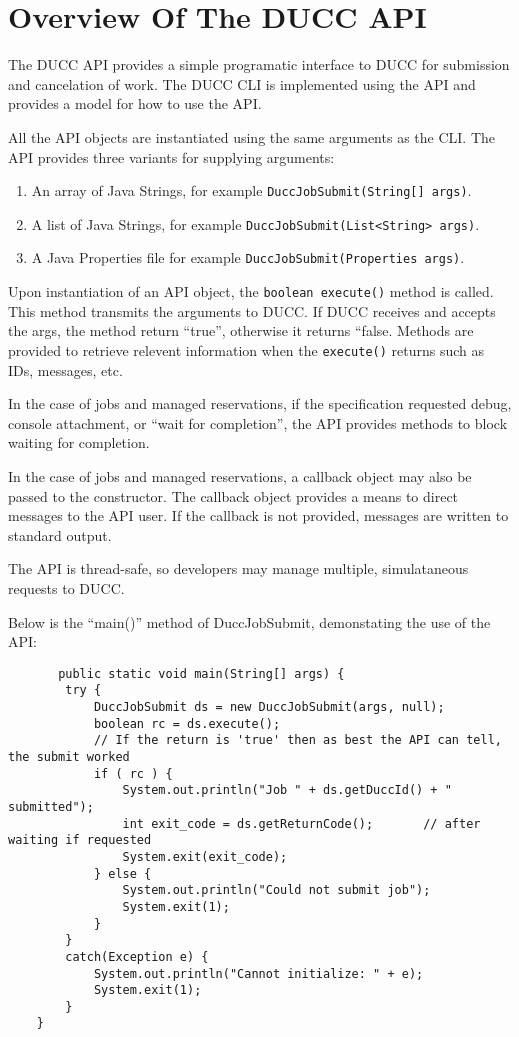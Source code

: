 \section{Overview Of The DUCC API}

   The DUCC API provides a simple programatic interface to DUCC for submission and
   cancelation of work.  The DUCC CLI is implemented using the API and provides a
   model for how to use the API.

   All the API objects are instantiated using the same arguments as the CLI.  The API
   provides three variants for supplying arguments:
   \begin{enumerate}
     \item An array of Java Strings, for example {\tt DuccJobSubmit(String[] args)}.
     \item A list of Java Strings,   for example {\tt DuccJobSubmit(List<String> args)}.
     \item A Java Properties file for example {\tt DuccJobSubmit(Properties args)}.
   \end{enumerate}

   Upon instantiation of an API object, the {\tt boolean execute()} method is called.  This
   method transmits the arguments to DUCC.  If DUCC receives and accepts the args, the method
   return ``true'', otherwise it returns ``false.  Methods are provided to retrieve relevent
   information when the {\tt execute()} returns such as IDs, messages, etc.

   In the case of jobs and managed reservations, if the specification requested debug,
   console attachment, or ``wait for completion'', the API provides methods to block
   waiting for completion.

   In the case of jobs and managed reservations, a callback object may also be passed to
   the constructor.  The callback object provides a means to direct messages to the
   API user.  If the callback is not provided, messages are written to standard output.

   The API is thread-safe, so developers may manage multiple, simulataneous requests to
   DUCC.

   Below is the ``main()'' method of DuccJobSubmit, demonstating the use of the API:
\begin{verbatim}   
       public static void main(String[] args) {
        try {
            DuccJobSubmit ds = new DuccJobSubmit(args, null);
            boolean rc = ds.execute();
            // If the return is 'true' then as best the API can tell, the submit worked
            if ( rc ) {                
                System.out.println("Job " + ds.getDuccId() + " submitted");
                int exit_code = ds.getReturnCode();       // after waiting if requested
                System.exit(exit_code);
            } else {
                System.out.println("Could not submit job");
                System.exit(1);
            }
        }
        catch(Exception e) {
            System.out.println("Cannot initialize: " + e);
            System.exit(1);
        }
    }
\end{verbatim}

